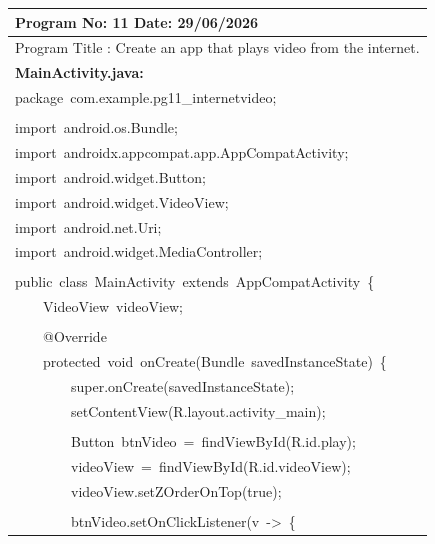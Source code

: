 \documentclass[a4paper,12pt]{article}
\begin{document}
\noindent\begingroup
\renewcommand{\arraystretch}{1.1}
\begin{longtable}{|p{}|}
\hline\endfirsthead\hline\endhead\hline\endfoot\hline\endlastfoot
\rule{0pt}{13pt}Program No: 11 \hfill Date: 29/06/2026 \\
\hline
\rule{0pt}{13pt}Program Title : Create an app that plays video from the internet. \\
\hline
\rule{0pt}{13pt}\textbf{MainActivity.java:} \\
\hline
{\ttfamily\small package\ com.example.pg11\_internetvideo;} \\
\strut \\
{\ttfamily\small import\ android.os.Bundle;} \\
{\ttfamily\small import\ androidx.appcompat.app.AppCompatActivity;} \\
{\ttfamily\small import\ android.widget.Button;} \\
{\ttfamily\small import\ android.widget.VideoView;} \\
{\ttfamily\small import\ android.net.Uri;} \\
{\ttfamily\small import\ android.widget.MediaController;} \\
\strut \\
{\ttfamily\small public\ class\ MainActivity\ extends\ AppCompatActivity\ \{} \\
{\ttfamily\small \ \ \ \ VideoView\ videoView;} \\
\strut \\
{\ttfamily\small \ \ \ \ @Override} \\
{\ttfamily\small \ \ \ \ protected\ void\ onCreate(Bundle\ savedInstanceState)\ \{} \\
{\ttfamily\small \ \ \ \ \ \ \ \ super.onCreate(savedInstanceState);} \\
{\ttfamily\small \ \ \ \ \ \ \ \ setContentView(R.layout.activity\_main);} \\
\strut \\
{\ttfamily\small \ \ \ \ \ \ \ \ Button\ btnVideo\ =\ findViewById(R.id.play);} \\
{\ttfamily\small \ \ \ \ \ \ \ \ videoView\ =\ findViewById(R.id.videoView);} \\
{\ttfamily\small \ \ \ \ \ \ \ \ videoView.setZOrderOnTop(true);} \\
\strut \\
{\ttfamily\small \ \ \ \ \ \ \ \ btnVideo.setOnClickListener(v\ -\textgreater{}\ \{} \\

\end{longtable}
\end{document}
